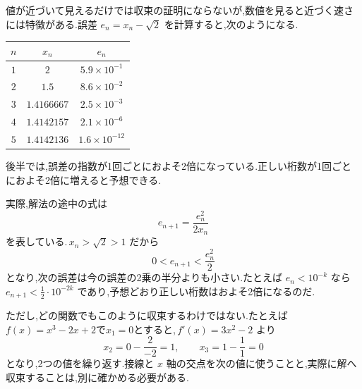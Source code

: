 値が近づいて見えるだけでは収束の証明にならないが,数値を見ると近づく速さには特徴がある.誤差 $e_n=x_n-\sqrt2$ を計算すると,次のようになる.
\begin{center}
\begin{tabular}{ccc}
\toprule
$n$ & $x_n$ & $e_n$\\
\midrule
$1$ & $2$ & $5.9\times10^{-1}$\\
$2$ & $1.5$ & $8.6\times10^{-2}$\\
$3$ & $1.4166667$ & $2.5\times10^{-3}$\\
$4$ & $1.4142157$ & $2.1\times10^{-6}$\\
$5$ & $1.4142136$ & $1.6\times10^{-12}$\\
\bottomrule
\end{tabular}
\end{center}
後半では,誤差の指数が1回ごとにおよそ2倍になっている.正しい桁数が1回ごとにおよそ2倍に増えると予想できる.

実際,解法の途中の式は
\[
 e_{n+1}=\frac{e_n^2}{2x_n}
\]
を表している.\,$x_n>\sqrt2>1$ だから
\[
 0<e_{n+1}<\frac{e_n^2}{2}
\]
となり,次の誤差は今の誤差の2乗の半分よりも小さい.たとえば $e_n<10^{-k}$ なら $e_{n+1}<\frac12\cdot10^{-2k}$ であり,予想どおり正しい桁数はおよそ2倍になるのだ.

ただし,どの関数でもこのように収束するわけではない.たとえば$f(x)=x^3-2x+2$で$x_1=0$とすると,\,$f'(x)=3x^2-2$ より
\[
 x_2=0-\frac{2}{-2}=1,\qquad x_3=1-\frac{1}{1}=0
\]
となり,2つの値を繰り返す.接線と $x$ 軸の交点を次の値に使うことと,実際に解へ収束することは,別に確かめる必要がある.
